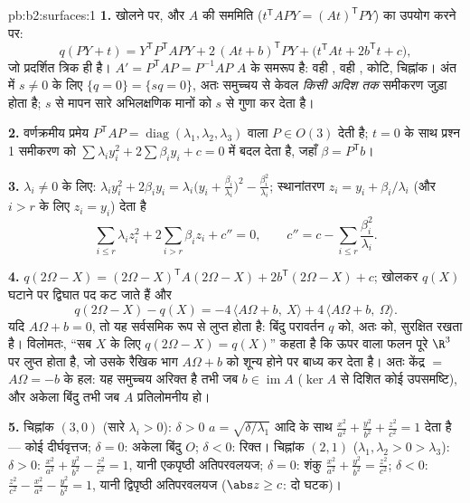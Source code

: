 \begin{solution}{pb:b2:surfaces:1}
\textbf{1.} खोलने पर, और $A$ की सममिति ($t^{\mathsf T}\!APY = (At)^{\mathsf T}PY$) का उपयोग करने पर:
\[
q(PY + t) = Y^{\mathsf T}P^{\mathsf T}\!APY +
2\,(At + b)^{\mathsf T}PY + \bigl(t^{\mathsf T}\!At +
2b^{\mathsf T}t + c\bigr),
\]
जो प्रदर्शित त्रिक ही है। $A' = P^{\mathsf T}\!AP =
P^{-1}AP$ $A$ के समरूप है: वही , वही , कोटि, चिह्नांक। अंत में $s \neq 0$ के लिए $\{q = 0\} = \{sq = 0\}$,
अतः समुच्चय से केवल \emph{किसी अदिश तक} समीकरण जुड़ा होता है;
$s$ से मापन सारे अभिलक्षणिक मानों को $s$ से गुणा कर देता है।

\textbf{2.} वर्णक्रमीय प्रमेय $P^{\mathsf T}\!AP = \operatorname{diag}(\lambda_1, \lambda_2,
\lambda_3)$ वाला $P \in O(3)$ देती है; $t = 0$ के साथ
प्रश्न 1 समीकरण को $\sum\lambda_iy_i^2 + 2\sum\beta_iy_i + c = 0$ में बदल देता है, जहाँ $\beta =
P^{\mathsf T}b$।

\textbf{3.} $\lambda_i \neq 0$ के लिए: $\lambda_iy_i^2 +
2\beta_iy_i = \lambda_i\bigl(y_i +
\frac{\beta_i}{\lambda_i}\bigr)^2 -
\frac{\beta_i^2}{\lambda_i}$; स्थानांतरण $z_i = y_i +
\beta_i/\lambda_i$ (और $i > r$ के लिए
$z_i = y_i$) देता है
\[
\sum_{i \leq r}\lambda_iz_i^2 + 2\sum_{i > r}\beta_iz_i +
c'' = 0, \qquad
c'' = c - \sum_{i\leq r}\frac{\beta_i^2}{\lambda_i}.
\]

\textbf{4.} $q(2\Omega - X) = (2\Omega - X)^{\mathsf T}
A(2\Omega - X) + 2b^{\mathsf T}(2\Omega - X) + c$; खोलकर $q(X)$ घटाने पर द्विघात पद कट जाते हैं और
\[
q(2\Omega - X) - q(X) = -4\,\langle A\Omega + b,\ X\rangle +
4\,\langle A\Omega + b,\ \Omega\rangle .
\]
यदि $A\Omega + b = 0$, तो यह सर्वसमिक रूप से लुप्त होता है: बिंदु परावर्तन
$q$ को, अतः  को, सुरक्षित रखता है। विलोमतः, ``सब $X$ के
लिए $q(2\Omega - X) = q(X)$'' कहता है कि ऊपर वाला  फलन पूरे $\R^3$ पर लुप्त होता है,
जो उसके रैखिक भाग $A\Omega + b$ को शून्य होने पर बाध्य कर देता है। अतः
केंद्र $=$ $A\Omega = -b$ के हल: यह समुच्चय अरिक्त है तभी जब $b \in \operatorname{im}A$ ($\ker A$
से दिशित कोई  उपसमष्टि), और अकेला बिंदु तभी जब $A$
प्रतिलोमनीय हो।

\textbf{5.} चिह्नांक $(3,0)$ (सारे $\lambda_i > 0$): $\delta >
0$ $a = \sqrt{\delta/\lambda_1}$ आदि के साथ $\frac{x^2}{a^2} + \frac{y^2}{b^2} + \frac{z^2}{c^2}
= 1$
देता है --- कोई दीर्घवृत्तज; $\delta = 0$: अकेला बिंदु $O$; $\delta < 0$: रिक्त।
चिह्नांक $(2,1)$ ($\lambda_1, \lambda_2 > 0 >
\lambda_3$): $\delta > 0$: $\frac{x^2}{a^2} + \frac{y^2}{b^2}
- \frac{z^2}{c^2} = 1$, यानी एकपृष्ठी अतिपरवलयज;
$\delta =
0$: शंकु $\frac{x^2}{a^2} + \frac{y^2}{b^2} =
\frac{z^2}{c^2}$; $\delta < 0$: $\frac{z^2}{c^2} -
\frac{x^2}{a^2} - \frac{y^2}{b^2} = 1$, यानी द्विपृष्ठी अतिपरवलयज
($\abs z \geq c$: दो घटक)।


\end{solution}

